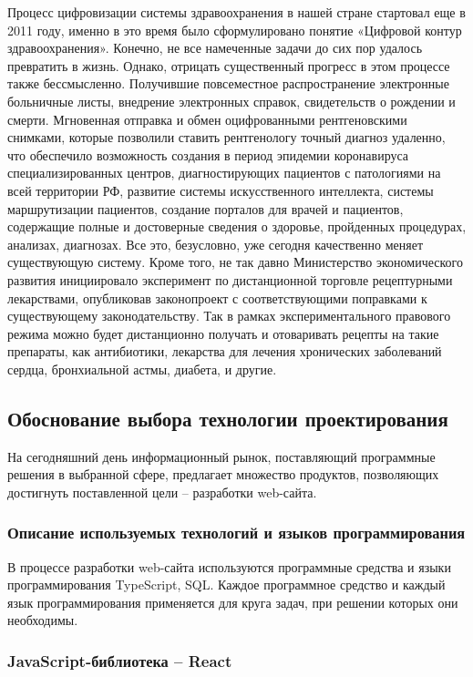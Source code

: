 Процесс цифровизации системы здравоохранения в нашей стране стартовал еще в 2011 году, именно в это время было сформулировано понятие «Цифровой контур здравоохранения». Конечно, не все намеченные задачи до сих пор удалось превратить в жизнь. Однако, отрицать существенный прогресс в этом процессе также бессмысленно. Получившие повсеместное распространение электронные больничные листы, внедрение электронных справок, свидетельств о рождении и смерти. Мгновенная отправка и обмен оцифрованными рентгеновскими снимками, которые позволили ставить рентгенологу точный диагноз удаленно, что обеспечило возможность создания в период эпидемии коронавируса специализированных центров, диагностирующих пациентов с патологиями на всей территории РФ, развитие системы искусственного интеллекта, системы маршрутизации пациентов, создание порталов для врачей и пациентов, содержащие полные и достоверные сведения о здоровье, пройденных процедурах, анализах, диагнозах. Все это, безусловно, уже сегодня качественно меняет существующую систему.
Кроме того, не так давно Министерство экономического развития инициировало эксперимент по дистанционной торговле рецептурными лекарствами, опубликовав законопроект с соответствующими поправками к существующему законодательству. Так в рамках экспериментального правового режима можно будет дистанционно получать и отоваривать рецепты на такие препараты, как антибиотики, лекарства для лечения хронических заболеваний сердца, бронхиальной астмы, диабета, и другие.

\subsection{Обоснование выбора технологии проектирования}

На сегодняшний день информационный рынок, поставляющий программные решения в выбранной сфере, предлагает множество продуктов, позволяющих достигнуть поставленной цели – разработки web-сайта.

\subsubsection{Описание используемых технологий и языков программирования}

В процессе разработки web-сайта используются программные средства и языки программирования TypeScript, SQL. Каждое программное средство и каждый язык программирования применяется для круга задач, при решении которых они необходимы.

\subsubsection{JavaScript-библиотека -- React}

